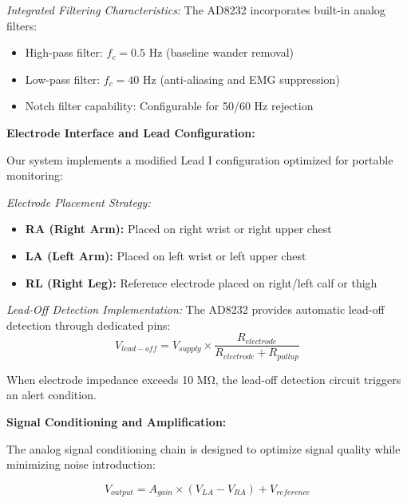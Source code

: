 \documentclass[12pt,a4paper]{article}
\begin{document}
\textit{Integrated Filtering Characteristics:}
The AD8232 incorporates built-in analog filters:
\begin{itemize}
\item High-pass filter: $f_c = 0.5$ Hz (baseline wander removal)
\item Low-pass filter: $f_c = 40$ Hz (anti-aliasing and EMG suppression)
\item Notch filter capability: Configurable for 50/60 Hz rejection
\end{itemize}

\vspace{0.5cm}

\textbf{Electrode Interface and Lead Configuration:}

Our system implements a modified Lead I configuration optimized for portable \\ monitoring:

\vspace{0.3cm}

\textit{Electrode Placement Strategy:}
\begin{itemize}
\item \textbf{RA (Right Arm):} Placed on right wrist or right upper chest
\item \textbf{LA (Left Arm):} Placed on left wrist or left upper chest  
\item \textbf{RL (Right Leg):} Reference electrode placed on right/left calf or thigh
\end{itemize}

\textit{Lead-Off Detection Implementation:}
The AD8232 provides automatic lead-off detection through dedicated pins:
\begin{equation*}
V_{lead-off} = V_{supply} \times \frac{R_{electrode}}{R_{electrode} + R_{pullup}}
\end{equation*}

When electrode impedance exceeds 10 MΩ, the lead-off detection circuit triggers an alert condition.

\vspace{0.5cm}

\textbf{Signal Conditioning and Amplification:}

The analog signal conditioning chain is designed to optimize signal quality while minimizing noise introduction:

\begin{equation*}
V_{output} = A_{gain} \times (V_{LA} - V_{RA}) + V_{reference}
\end{equation*}
\end{document}
